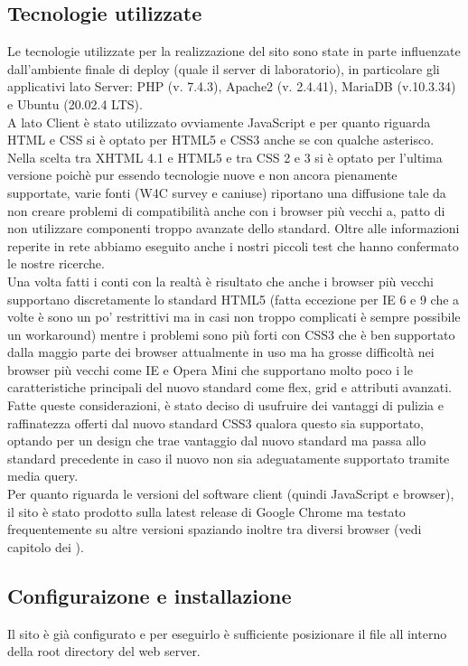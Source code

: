     \subsection{Tecnologie utilizzate}
    Le tecnologie utilizzate per la realizzazione del sito sono state in parte influenzate dall’ambiente finale di deploy (quale il server di laboratorio), in particolare gli applicativi lato Server: PHP (v. 7.4.3), Apache2 (v. 2.4.41), MariaDB (v.10.3.34) e Ubuntu (20.02.4 LTS).\\
    A lato Client è stato utilizzato ovviamente JavaScript e per quanto riguarda HTML e CSS si è optato per HTML5 e CSS3 anche se con qualche asterisco. Nella scelta tra XHTML 4.1 e HTML5 e tra CSS 2 e 3 si è optato per l’ultima versione poichè pur essendo tecnologie nuove e non ancora pienamente supportate, varie fonti (W4C survey e caniuse) riportano una diffusione tale da non creare problemi di compatibilità anche con i browser più vecchi a, patto di non utilizzare componenti troppo avanzate dello standard. Oltre alle informazioni reperite in rete abbiamo eseguito anche i nostri piccoli test che hanno confermato le nostre ricerche.\\
    Una volta fatti i conti con la realtà è risultato che anche i browser più vecchi supportano discretamente lo standard HTML5 (fatta eccezione per IE 6 e 9 che a volte è sono un po’ restrittivi ma in casi non troppo complicati è sempre possibile un workaround) mentre i problemi sono più forti con CSS3 che è ben supportato dalla maggio parte dei browser attualmente in uso ma ha grosse difficoltà nei browser più vecchi come IE e Opera Mini che supportano molto poco i le caratteristiche principali del nuovo standard come flex, grid e attributi avanzati.\\
    Fatte queste considerazioni, è stato deciso di usufruire dei vantaggi di pulizia e raffinatezza offerti dal nuovo standard CSS3 qualora questo sia supportato, optando per un design che trae vantaggio dal nuovo standard ma passa allo standard precedente in caso il nuovo non sia adeguatamente supportato tramite media query.\\
    Per quanto riguarda le versioni del software client (quindi JavaScript e browser), il sito è stato prodotto sulla latest release di Google Chrome ma testato frequentemente su altre versioni spaziando inoltre tra diversi browser (vedi capitolo dei ).
    \subsection{Configuraizone e installazione}
    Il sito è già configurato e per eseguirlo è sufficiente posizionare il file all interno della root directory del web server.